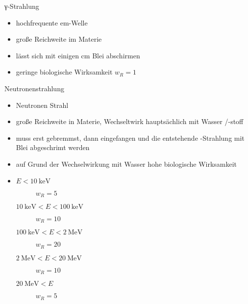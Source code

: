 \begin{frame}{γ-Strahlung}
	\begin{itemize}
		\item hochfrequente em-Welle
		\item große Reichweite im Materie
		\item lässt sich mit einigen \si{\centi \meter} Blei abschirmen
		\item geringe biologische Wirksamkeit $w_R=1$
	\end{itemize}
\end{frame}
\begin{frame}{Neutronenstrahlung}
\begin{itemize}
	\item Neutronen Strahl
	\item große Reichweite in Materie, Wechseltwirk hauptsächlich mit Wasser /-stoff
	\item muss erst gebremmst, dann eingefangen und die entstehende \gamma-Strahlung mit Blei abgeschrimt werden
	\item auf Grund der Wechselwirkung mit Wasser hohe biologische Wirksamkeit
	\item \begin{description}
		\item[$E<\SI{10}{\kilo \electronvolt}$] $w_R=5$
		\item[$\SI{10}{\kilo \electronvolt}<E<\SI{100}{\kilo \electronvolt}$] $w_R=10$
		\item[$\SI{100}{\kilo \electronvolt}<E<\SI{2}{\mega \electronvolt}$] $w_R=20$
		\item[$\SI{2}{\mega \electronvolt}<E<\SI{20}{\mega \electronvolt}$] $w_R=10$
		\item[$\SI{20}{\mega \electronvolt}<E$] $w_R=5$
	\end{description}\cite{straschuver}
\end{itemize}
\end{frame}
\nocite{BfS}
